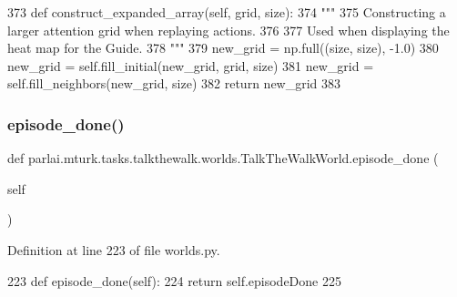 \begin{DoxyCode}
373     \textcolor{keyword}{def }construct\_expanded\_array(self, grid, size):
374         \textcolor{stringliteral}{"""}
375 \textcolor{stringliteral}{        Constructing a larger attention grid when replaying actions.}
376 \textcolor{stringliteral}{}
377 \textcolor{stringliteral}{        Used when displaying the heat map for the Guide.}
378 \textcolor{stringliteral}{        """}
379         new\_grid = np.full((size, size), -1.0)
380         new\_grid = self.fill\_initial(new\_grid, grid, size)
381         new\_grid = self.fill\_neighbors(new\_grid, size)
382         \textcolor{keywordflow}{return} new\_grid
383 
\end{DoxyCode}
\mbox{\label{classparlai_1_1mturk_1_1tasks_1_1talkthewalk_1_1worlds_1_1TalkTheWalkWorld_aa1470711aa1a8346a69f5eb0aa774590}} 
\subsubsection{\texorpdfstring{episode\+\_\+done()}{episode\_done()}}
{\footnotesize\ttfamily def parlai.\+mturk.\+tasks.\+talkthewalk.\+worlds.\+Talk\+The\+Walk\+World.\+episode\+\_\+done (\begin{DoxyParamCaption}\item[{}]{self }\end{DoxyParamCaption})}



Definition at line 223 of file worlds.\+py.


\begin{DoxyCode}
223     \textcolor{keyword}{def }episode\_done(self):
224         \textcolor{keywordflow}{return} self.episodeDone
225 
\end{DoxyCode}
\mbox{\label{classparlai_1_1mturk_1_1tasks_1_1talkthewalk_1_1worlds_1_1TalkTheWalkWorld_a02bbcb1c7fb2301308620a9844427112}} 
